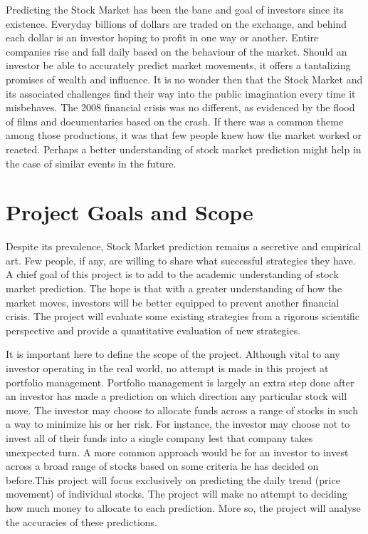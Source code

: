 \documentclass{report}
\begin{document}
Predicting the Stock Market has been the bane and goal of investors since its existence. Everyday billions of dollars are traded on the exchange, and behind each dollar is an investor hoping to profit in one way or another. Entire companies rise and fall daily based on the behaviour of the market. Should an investor be able to accurately predict market movements, it offers a tantalizing promises of wealth and influence. It is no wonder then that the Stock Market and its associated challenges find their way into the public imagination every time it misbehaves. The 2008 financial crisis was no different, as evidenced by the flood of films and documentaries based on the crash. If there was a common theme among those productions, it was that few people knew how the market worked or reacted. Perhaps a better understanding of stock market prediction might help in the case of similar events in the future.

\section{Project Goals and Scope}

Despite its prevalence, Stock Market prediction remains a secretive and empirical art. Few people, if any, are willing to share what  successful strategies they have. A chief goal of this project is to add to the academic understanding of stock market prediction. The hope is that with a greater understanding of how the market moves, investors will be better equipped to prevent another financial crisis. The project will evaluate some existing strategies from a rigorous scientific perspective and provide a quantitative evaluation of new strategies. 

It is important here to define the scope of the project. Although vital to any investor operating in the real world, no attempt is made in this project at portfolio management. Portfolio management is largely an extra step done after an investor has made a prediction on which direction any particular stock will move. The investor may choose to allocate funds across a range of stocks in such a way to minimize his or her risk. For instance, the investor may choose not to invest all of their funds into a single company lest that company takes unexpected turn. A more common approach would be for an investor to invest across a broad range of stocks based on some criteria he has decided on before.This project will focus exclusively on predicting the daily trend (price movement) of individual stocks. The project will make no attempt to deciding how much money to allocate to each prediction.  More so, the project will analyse the accuracies of these predictions. 
\end{document}
